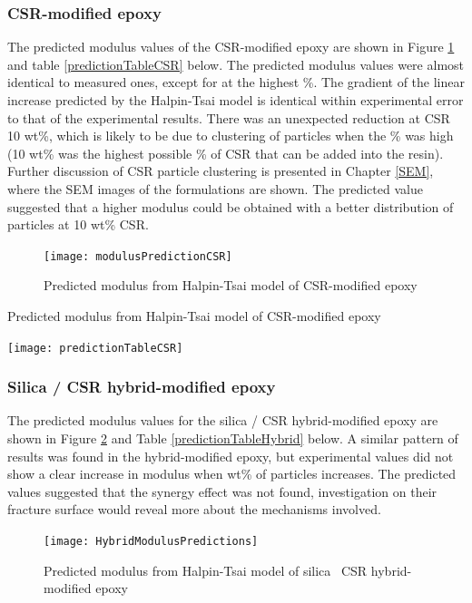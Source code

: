 \documentclass[numbers=noendperiod,chapterprefix=on]{icldt} %
\begin{document}
\subsubsection{CSR-modified epoxy}
The predicted modulus values of the CSR-modified epoxy are shown in Figure \ref{modulusPredictionCSR} and table \ref{predictionTableCSR} below. The predicted modulus values were almost identical to measured ones, except for at the highest \%. The gradient of the linear increase predicted by the Halpin-Tsai model is identical within experimental error to that of the experimental results.
There was an unexpected reduction at CSR 10 wt\%, which is likely to be due to clustering of particles when the \% was high (10 wt\% was the highest possible \% of CSR that can be added into the resin). 
Further discussion of CSR particle clustering is presented  in Chapter \ref{SEM}, where the SEM images of the formulations are shown.
The predicted value suggested that a higher modulus could be obtained with a better distribution of particles at 10 wt\% CSR. 

\begin{figure}[!htpb]
\centering
\texttt{[image: modulusPredictionCSR]}
\caption{Predicted modulus from Halpin-Tsai model of CSR-modified epoxy} \label{modulusPredictionCSR}
\end{figure}
\FloatBarrier

\begin{table}[!htpb]
\centering
\caption{Predicted modulus from Halpin-Tsai model of CSR-modified epoxy } \label{predictionTableCSR}
\texttt{[image: predictionTableCSR]}
\end{table}
\FloatBarrier

\subsubsection{Silica / CSR hybrid-modified epoxy}

The predicted modulus values for the silica / CSR hybrid-modified epoxy are shown in Figure \ref{HybridModulusPredictions} and Table \ref{predictionTableHybrid} below. A similar pattern of results was found in the hybrid-modified epoxy, but experimental values did not show a clear increase in modulus when wt\% of particles increases. The predicted values suggested that the synergy effect was not found, investigation on their fracture surface would reveal more about the mechanisms involved. 

\begin{figure}[!htpb]
\centering
\texttt{[image: HybridModulusPredictions]}
\caption{Predicted modulus from Halpin-Tsai model of silica \ CSR hybrid-modified epoxy}\label{HybridModulusPredictions}
\end{figure}
\FloatBarrier
\end{document}
